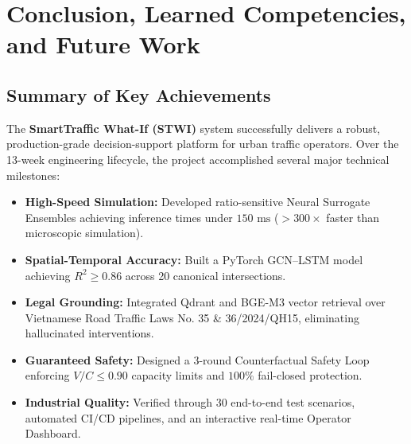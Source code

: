 \chapter{Conclusion, Learned Competencies, and Future Work}
\label{chapter:conclusion}

\section{Summary of Key Achievements}
The \textbf{SmartTraffic What-If (STWI)} system successfully delivers a robust, production-grade decision-support platform for urban traffic operators. Over the 13-week engineering lifecycle, the project accomplished several major technical milestones:
\begin{itemize}[leftmargin=1.5cm, label=$\bullet$]
  \item \textbf{High-Speed Simulation:} Developed ratio-sensitive Neural Surrogate Ensembles achieving inference times under $150\text{ ms}$ ($> 300\times$ faster than microscopic simulation).
  \item \textbf{Spatial-Temporal Accuracy:} Built a PyTorch GCN--LSTM model achieving $R^2 \ge 0.86$ across 20 canonical intersections.
  \item \textbf{Legal Grounding:} Integrated Qdrant and BGE-M3 vector retrieval over Vietnamese Road Traffic Laws No. 35 \& 36/2024/QH15, eliminating hallucinated interventions.
  \item \textbf{Guaranteed Safety:} Designed a 3-round Counterfactual Safety Loop enforcing $V/C \le 0.90$ capacity limits and $100\%$ fail-closed protection.
  \item \textbf{Industrial Quality:} Verified through 30 end-to-end test scenarios, automated CI/CD pipelines, and an interactive real-time Operator Dashboard.
\end{itemize}

